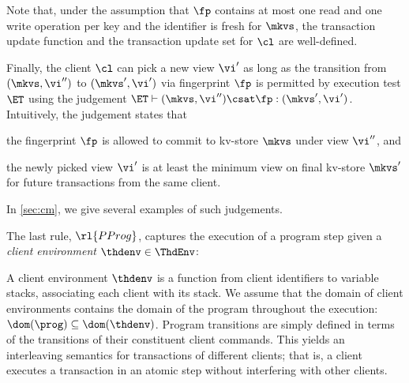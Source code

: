 Note that,  under the assumption that $\fp$ contains at most one read and one write 
operation per key and the identifier is fresh for $\mkvs$, 
the transaction update function and the transaction update set for
$\cl$ are well-defined. 

Finally, the client \( \cl \) can pick a new view \( \vi' \) as long as 
the transition from \( (\mkvs, \vi'') \) to \( (\mkvs', \vi') \)  via fingerprint \( \fp \) 
is permitted by execution test $\ET$ using the judgement $\ET \vdash (\mkvs, \vi'') \csat \fp : (\mkvs', \vi')$.
Intuitively, the judgement states that 
\begin{enumerate*}
    \item the fingerprint $\fp$ is allowed to commit to kv-store $\mkvs$ under view $\vi''$, 
    and \item the newly picked view $\vi'$ is at least the minimum view on final kv-store \( \mkvs' \) 
    for future transactions from the same client.
\end{enumerate*}
In \cref{sec:cm}, we give several examples of such judgements.

The last rule, \( \rl{PProg} \), captures the execution of a program step 
given a \emph{client environment} $\thdenv \in \ThdEnv$:
\begin{mathpar}
\end{mathpar}
A client environment $\thdenv$ is a function from client identifiers to variable stacks, associating each client with its stack. 
We assume that the domain of client environments contains 
the domain of the program throughout the execution: 
$\dom(\prog) \subseteq \dom(\thdenv)$.
Program transitions are simply defined in terms of the transitions of
their constituent client commands. 
This yields an interleaving semantics for transactions of different clients; 
that is, a client executes a transaction in an atomic step without
interfering with other clients. 
